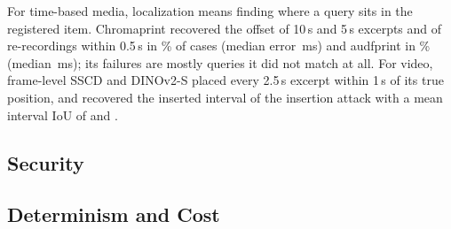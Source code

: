 For time-based media, localization means finding where a query sits in the registered item. Chromaprint recovered the offset of 10\,s and 5\,s excerpts and of re-recordings within 0.5\,s in \% of cases (median error \,ms) and audfprint in \% (median \,ms); its failures are mostly queries it did not match at all. For video, frame-level SSCD and DINOv2-S placed every 2.5\,s excerpt within 1\,s of its true position, and recovered the inserted interval of the insertion attack with a mean interval IoU of  and .

\subsection{Security}
\label{sec:fp-res-security}



\subsection{Determinism and Cost}
\label{sec:fp-res-cost}

